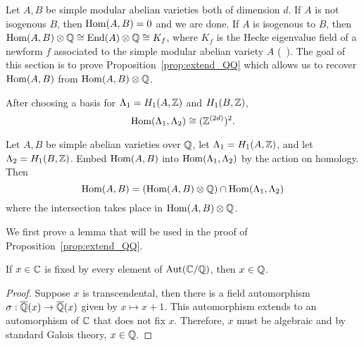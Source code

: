 Let $A, B$ be simple modular abelian varieties both of dimension $d$. If $A$ is
not isogenous $B$, then $\operatorname{Hom}(A, B)=0$ and we are done. If $A$ is isogenous to
$B$, then $\operatorname{Hom}(A,B)\otimes \mathbb{Q} \cong \operatorname{End}(A)\otimes \mathbb{Q}\cong K_f$, where $K_f$
is the Hecke eigenvalue field of a newform $f$ associated to the simple modular
abelian variety $A$ (~\cite{shimura}). The goal of this section is to prove
Proposition~\ref{prop:extend_QQ} which allows us to recover $\operatorname{Hom}(A,B)$ from
$\operatorname{Hom}(A,B)\otimes \mathbb{Q}$.

After choosing a basis for $\Lambda_1 = H_1(A, \mathbb{Z})$ and $H_1(B, \mathbb{Z})$, 
\[
    \operatorname{Hom}(\Lambda_1, \Lambda_2) \cong (\mathbb{Z}^{(2d)})^2.
\]
\begin{proposition}%
    \label{prop:extend_QQ}
    Let $A, B$ be simple abelian varieties over $\mathbb{Q}$, let $\Lambda_1=H_1(A,
    \mathbb{Z})$, and let $\Lambda_2=H_1(B, \mathbb{Z})$. Embed $\operatorname{Hom}(A, B)$ into
    $\operatorname{Hom}(\Lambda_1, \Lambda_2)$ by the action on homology. Then
    \[
        \operatorname{Hom}(A, B) = 
        (\operatorname{Hom}(A, B) \otimes \mathbb{Q})\cap \operatorname{Hom}(\Lambda_1, \Lambda_2)
    \]
    where the intersection takes place in $\operatorname{Hom}(A,B)\otimes \mathbb{Q}$.
\end{proposition}

We first prove a lemma that will be used in the proof of
Proposition~\ref{prop:extend_QQ}.

\begin{lemma}%
    \label{lem:aut}
    If $x\in \mathbb{C}$ is fixed by every element of $\operatorname{Aut}(\mathbb{C}/\mathbb{Q})$, then $x\in
    \mathbb{Q}$.
\end{lemma}
\begin{proof}
    Suppose $x$ is transcendental, then there is a field automorphism
    $\sigma:\overline{\mathbb{Q}}(x)\to\overline{\mathbb{Q}}(x)$ given by $x\mapsto x+1$. This automorphism
    extends to an automorphism of $\mathbb{C}$ that does not fix $x$. Therefore, $x$
    must be algebraic and by standard Galois theory, $x\in \mathbb{Q}$.
\end{proof}

